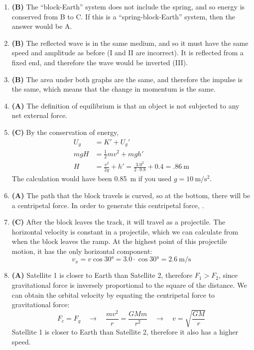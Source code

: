 \documentclass{../../oss-handout}
\begin{document}
\begin{enumerate}[leftmargin=15pt]
\item\textbf{(B)} The ``block-Earth'' system does not include the spring, and
  so energy is conserved from B to C. If this is a ``spring-block-Earth''
  system, then the answer would be A.

\item\textbf{(B)} The reflected wave is in the same medium, and so it must have
  the same speed and amplitude as before (I and II are incorrect). It is
  reflected from a fixed end, and therefore the wave would be inverted (III).

\item\textbf{(B)} The area under both graphs are the same, and therefore the
  impulse is the same, which means that the change in momentum is the same.

\item\textbf{(A)} The definition of equilibrium is that an object is not
  subjected to any net external force.

\item\textbf{(C)} By the conservation of energy,
  \begin{align*}
    U_g &= K'+U_g'\\
    mgH &= \frac12mv^2+mgh'\\
    H &= \frac{v^2}{2g}+h'=\frac{3.0^2}{2\cdot9.8}+0.4=\boxed{\SI{.86}{\metre}}
  \end{align*}
  The calculation would have been \SI{.85}{\metre} if you used
  $g=\SI{10}{\metre\per\second\squared}$.

\item\textbf{(A)} The path that the block travels is curved, so at the bottom,
  there will be a centripetal force. In order to generate this centripetal
  force, .

\item\textbf{(C)} After the block leaves the track, it will travel as a
  projectile. The horizontal velocity is constant in a projectile, which we
  can calculate from when the block leaves the ramp. At the highest point of
  this projectile motion, it has the only horizontal component:
  \begin{displaymath}
    v_x=v\cos\ang{30}=3.0\cdot\cos\ang{30}=
    \boxed{\SI{2.6}{\metre\per\second}}
  \end{displaymath}

\item\textbf{(A)} Satellite 1 is closer to Earth than Satellite 2, therefore
  $F_1>F_2$, since gravitational force is inversely proportional to the square
  of the distance. We can obtain the orbital velocity by equating the
  centripetal force to gravitational force:
  \begin{equation*}
    F_c=F_g\quad\rightarrow\quad
    \frac{mv^2}{r}=\frac{GMm}{r^2}\quad\rightarrow\quad
    v=\sqrt{\frac{GM}{r}}
  \end{equation*}
  Satellite 1 is closer to Earth than Satellite 2, therefore it also has a
  higher speed.
  

\end{enumerate}
\end{document}

